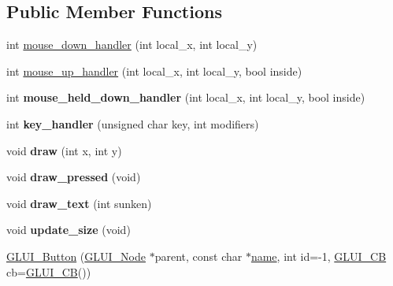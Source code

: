 \subsection*{Public Member Functions}
\begin{DoxyCompactItemize}
\item 
int \hyperlink{classGLUI__Button_ad049e31e22fddf61df229c6fcef80f27}{mouse\-\_\-down\-\_\-handler} (int local\-\_\-x, int local\-\_\-y)
\item 
int \hyperlink{classGLUI__Button_a731c78e9ae9fe92fe5e0eba47fc6c0cf}{mouse\-\_\-up\-\_\-handler} (int local\-\_\-x, int local\-\_\-y, bool inside)
\item 
\hypertarget{classGLUI__Button_a38e99372cc0de31dfa784b95e70d1f51}{int {\bfseries mouse\-\_\-held\-\_\-down\-\_\-handler} (int local\-\_\-x, int local\-\_\-y, bool inside)}\label{classGLUI__Button_a38e99372cc0de31dfa784b95e70d1f51}

\item 
\hypertarget{classGLUI__Button_abb99757083838d0f9c87596b512ec5e9}{int {\bfseries key\-\_\-handler} (unsigned char key, int modifiers)}\label{classGLUI__Button_abb99757083838d0f9c87596b512ec5e9}

\item 
\hypertarget{classGLUI__Button_a0b70efaf00fe4eeb26f2675c156fc48f}{void {\bfseries draw} (int x, int y)}\label{classGLUI__Button_a0b70efaf00fe4eeb26f2675c156fc48f}

\item 
\hypertarget{classGLUI__Button_a445e459227bf0019217ec05e064d3f67}{void {\bfseries draw\-\_\-pressed} (void)}\label{classGLUI__Button_a445e459227bf0019217ec05e064d3f67}

\item 
\hypertarget{classGLUI__Button_a3012a081189288aa6190258f6fd47c9c}{void {\bfseries draw\-\_\-text} (int sunken)}\label{classGLUI__Button_a3012a081189288aa6190258f6fd47c9c}

\item 
\hypertarget{classGLUI__Button_a374f9334b7a026ba6e63d4911039d456}{void {\bfseries update\-\_\-size} (void)}\label{classGLUI__Button_a374f9334b7a026ba6e63d4911039d456}

\item 
\hyperlink{classGLUI__Button_ab7ddf8c8d6c6c3dcab55b1738b1e7b8d}{G\-L\-U\-I\-\_\-\-Button} (\hyperlink{classGLUI__Node}{G\-L\-U\-I\-\_\-\-Node} $\ast$parent, const char $\ast$\hyperlink{classGLUI__Control_aa95b97d50df45335fc33f0af03958eb3}{name}, int id=-\/1, \hyperlink{classGLUI__CB}{G\-L\-U\-I\-\_\-\-C\-B} cb=\hyperlink{classGLUI__CB}{G\-L\-U\-I\-\_\-\-C\-B}())
\end{DoxyCompactItemize}
